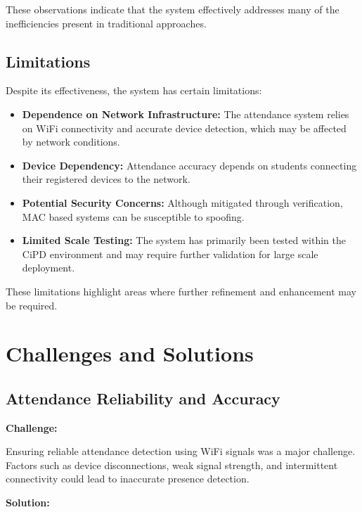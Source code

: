 These observations indicate that the system effectively addresses many of the inefficiencies present
in traditional approaches.

\section{Limitations}

Despite its effectiveness, the system has certain limitations:

\begin{itemize}
    \item \textbf{Dependence on Network Infrastructure:} The attendance system relies on WiFi connectivity
    and accurate device detection, which may be affected by network conditions.
    \item \textbf{Device Dependency:} Attendance accuracy depends on students connecting their registered
    devices to the network.
    \item \textbf{Potential Security Concerns:} Although mitigated through verification, MAC based systems
    can be susceptible to spoofing.
    \item \textbf{Limited Scale Testing:} The system has primarily been tested within the CiPD environment
    and may require further validation for large scale deployment.
\end{itemize}

These limitations highlight areas where further refinement and enhancement may be required.

\chapter{Challenges and Solutions}

\section{Attendance Reliability and Accuracy}

\textbf{Challenge:}

Ensuring reliable attendance detection using WiFi signals was a major challenge. Factors such as
device disconnections, weak signal strength, and intermittent connectivity could lead to inaccurate
presence detection.

\textbf{Solution:}

